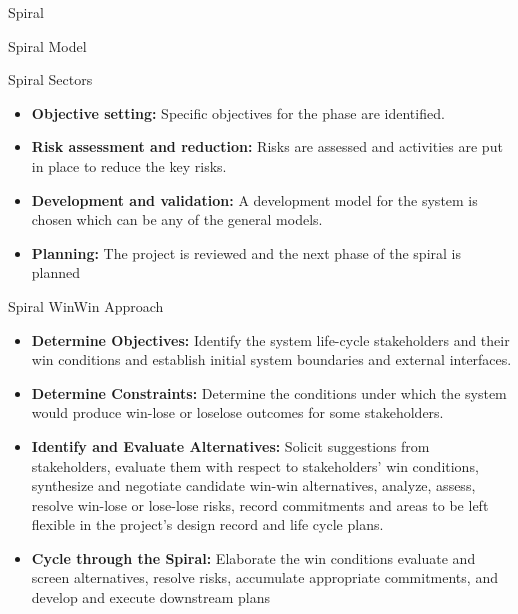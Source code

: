\documentclass[final,hyperref={pdfpagelabels=false}]{beamer}
\begin{document}
\begin{frame}{Spiral}
\begin{block}{\large Spiral Model}
    \end{block}
    \vfill
    \begin{block}{\large Spiral Sectors}
        \centering
        \begin{itemize}
            \item \textbf{ Objective setting:} Specific objectives for the phase are
            identified.
            \item \textbf{ Risk assessment and reduction:} Risks are assessed and
            activities are put in place to reduce the key risks.
            \item \textbf{ Development and validation:} A development model
            for the system is chosen which can be any of the
            general models.
            \item \textbf{ Planning:} The project is reviewed and the next phase
            of the spiral is planned
        \end{itemize}
    \end{block}  
    \vfill
     \begin{block}{\large Spiral WinWin Approach}
        \centering
        \begin{itemize}
            \item \textbf{ Determine Objectives:} Identify the system life-cycle
            stakeholders and their win conditions and establish initial
            system boundaries and external interfaces.
            \item \textbf{ Determine Constraints:} Determine the conditions
            under which the system would produce win-lose or loselose
            outcomes for some stakeholders.
            \item \textbf{ Identify and Evaluate Alternatives:} Solicit
            suggestions from stakeholders, evaluate them with respect
            to stakeholders' win conditions, synthesize and negotiate
            candidate win-win alternatives, analyze, assess, resolve
            win-lose or lose-lose risks, record commitments and areas
            to be left flexible in the project's design record and life
            cycle plans.
            \item \textbf{ Cycle through the Spiral:} Elaborate the win conditions
            evaluate and screen alternatives, resolve risks, accumulate
            appropriate commitments, and develop and execute
            downstream plans
        \end{itemize}
    \end{block}  

\end{frame}
\end{document}
